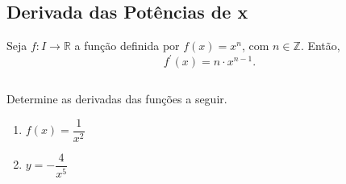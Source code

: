 \subsection{Derivada das Potências de x}
\begin{frame}
  \begin{theorem}
    Seja $f:I\rightarrow\mathbb{R}$ a função definida por $f(x) = x^{n}$, com $n\in\mathbb{Z}$. Então, 
    \begin{equation*}
      f^{\prime}(x) = n\cdot x^{n-1}.
    \end{equation*}
  \end{theorem}
  \begin{columns}[onlytextwidth]
    \begin{column}{0.55\textwidth}
      \begin{example-highlight}
        Determine as derivadas das funções a seguir.
        \begin{enumerate}
          \item $f(x) = \dfrac{1}{x^{2}}$
          \item $y = -\dfrac{4}{x^{5}}$
        \end{enumerate}
      \end{example-highlight}
    \end{column}
    \begin{column}{0.43\textwidth}\vspace{-0.6cm}
    \end{column}
  \end{columns}
\end{frame}

